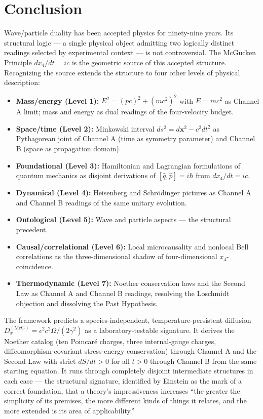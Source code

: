 \documentclass[11pt,a4paper]{article}
\begin{document}
\section{Conclusion}
\label{sec:conclusion}

Wave/particle duality has been accepted physics for ninety-nine years. Its structural logic --- a single physical object admitting two logically distinct readings selected by experimental context --- is not controversial. The McGucken Principle $dx_4/dt = ic$ is the geometric source of this accepted structure. Recognizing the source extends the structure to four other levels of physical description:

\begin{itemize}
\item \textbf{Mass/energy (Level 1):} $E^2 = (pc)^2 + (mc^2)^2$ with $E = mc^2$ as Channel A limit; mass and energy as dual readings of the four-velocity budget.
\item \textbf{Space/time (Level 2):} Minkowski interval $ds^2 = d\mathbf{x}^2 - c^2 dt^2$ as Pythagorean joint of Channel A (time as symmetry parameter) and Channel B (space as propagation domain).
\item \textbf{Foundational (Level 3):} Hamiltonian and Lagrangian formulations of quantum mechanics as disjoint derivations of $[\hat{q}, \hat{p}] = i\hbar$ from $dx_4/dt = ic$.
\item \textbf{Dynamical (Level 4):} Heisenberg and Schr\"odinger pictures as Channel A and Channel B readings of the same unitary evolution.
\item \textbf{Ontological (Level 5):} Wave and particle aspects --- the structural precedent.
\item \textbf{Causal/correlational (Level 6):} Local microcausality and nonlocal Bell correlations as the three-dimensional shadow of four-dimensional $x_4$-coincidence.
\item \textbf{Thermodynamic (Level 7):} Noether conservation laws and the Second Law as Channel A and Channel B readings, resolving the Loschmidt objection and dissolving the Past Hypothesis.
\end{itemize}

The framework predicts a species-independent, temperature-persistent diffusion $D_x^{(\text{McG})} = \epsilon^2 c^2 \Omega/(2\gamma^2)$ as a laboratory-testable signature. It derives the Noether catalog (ten Poincar\'e charges, three internal-gauge charges, diffeomorphism-covariant stress-energy conservation) through Channel A and the Second Law with strict $dS/dt > 0$ for all $t > 0$ through Channel B from the same starting equation. It runs through completely disjoint intermediate structures in each case --- the structural signature, identified by Einstein as the mark of a correct foundation, that a theory's impressiveness increases ``the greater the simplicity of its premises, the more different kinds of things it relates, and the more extended is its area of applicability.''
\end{document}
